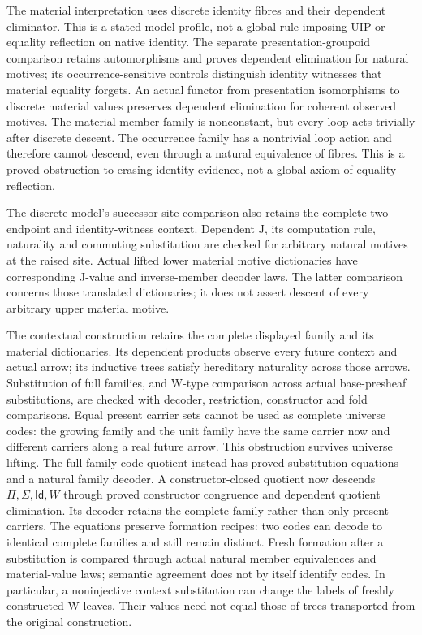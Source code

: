 \documentclass[11pt]{article}
\theoremstyle{definition}
\theoremstyle{remark}
\begin{document}
The material interpretation uses discrete identity fibres and their dependent
eliminator.  This is a stated model profile, not a global rule imposing UIP or
equality reflection on native identity.  The separate presentation-groupoid
comparison retains automorphisms and proves dependent elimination for natural
motives; its occurrence-sensitive controls distinguish identity witnesses that
material equality forgets.  An actual functor from presentation isomorphisms
to discrete material values preserves dependent elimination for coherent
observed motives.  The material member family is nonconstant, but every loop
acts trivially after discrete descent.  The occurrence family has a nontrivial
loop action and therefore cannot descend, even through a natural equivalence
of fibres.  This is a proved obstruction to erasing identity evidence, not a
global axiom of equality reflection.

The discrete model's successor-site comparison also retains the complete
two-endpoint and identity-witness context.  Dependent J, its computation
rule, naturality and commuting substitution are checked for arbitrary
natural motives at the raised site.  Actual lifted lower material motive
dictionaries have corresponding J-value and inverse-member decoder laws.
The latter comparison concerns those translated dictionaries; it does not
assert descent of every arbitrary upper material motive.

The contextual construction retains the complete displayed family and its
material dictionaries.  Its dependent products observe every future context
and actual arrow; its inductive trees satisfy hereditary naturality across
those arrows.  Substitution of full families, and W-type comparison across
actual base-presheaf substitutions, are checked with decoder, restriction,
constructor and fold comparisons.  Equal present carrier sets cannot be
used as complete universe codes: the growing family and the unit family
have the same carrier now and different carriers along a real future arrow.
This obstruction survives universe lifting.  The full-family code quotient
instead has proved substitution equations and a natural family decoder.
A constructor-closed quotient now descends $\Pi,\Sigma,\mathsf{Id},W$
through proved constructor congruence and dependent quotient elimination.
Its decoder retains the complete family rather than only present carriers.
The equations preserve formation recipes: two codes can decode to identical
complete families and still remain distinct.  Fresh formation after a
substitution is compared through actual natural member equivalences and
material-value laws; semantic agreement does not by itself identify codes.
In particular, a noninjective context substitution can change the labels of
freshly constructed W-leaves.  Their values need not equal those of trees
transported from the original construction.
\end{document}
